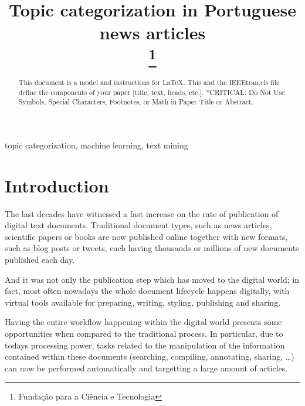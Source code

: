 \documentclass[conference]{IEEEtran}
\begin{document}

\title{Topic categorization in Portuguese news articles\\
\thanks{Fundação para a Ciência e Tecnologia} }


\author{
 }

\maketitle

\begin{abstract} This document is a model and instructions for \LaTeX.
This and the IEEEtran.cls file define the components of your paper
[title, text, heads, etc.]. *CRITICAL: Do Not Use Symbols, Special
Characters, Footnotes, or Math in Paper Title or Abstract.
\end{abstract}

\begin{IEEEkeywords} topic categorization, machine learning, text
mining \end{IEEEkeywords}

\section{Introduction}
The last decades have witnessed a fast increase on the rate of publication
of digital text documents. Traditional document types, such as news
articles, scientific papers or books are now published online together
with new formats, such as blog posts or tweets, each having thousands
or millions of new documents published each day.

And it was not only the publication step which has moved to the
digital world; in fact, most often nowadays the whole document
lifecycle happens digitally, with virtual tools available for
preparing, writing, styling, publishing and sharing.

Having the entire workflow happening within the digital world presents
some opportunities when compared to the traditional process. In
particular, due to todays processing power, tasks related to the
manipulation of the information contained within these documents
(searching, compiling, annotating, sharing, \dots) can now be
performed automatically and targetting a large amount of articles.
\end{document}
